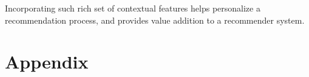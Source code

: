 \documentclass{article}
\begin{document}
Incorporating such rich set of contextual features helps personalize a recommendation process, and provides value addition to a recommender system.

\section{Appendix}

%
%
\end{document}
